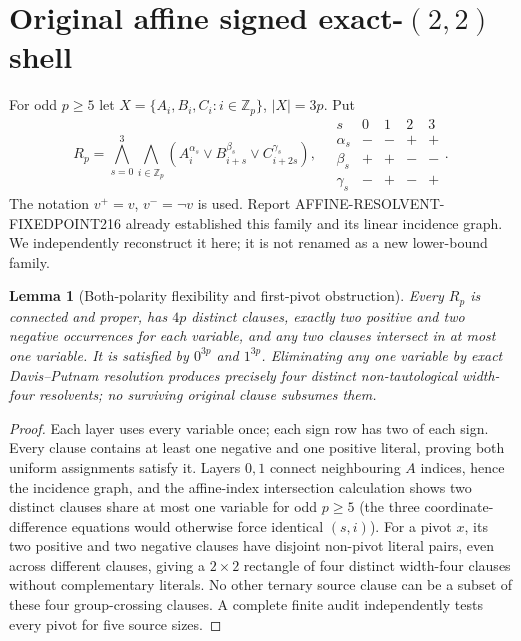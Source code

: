 \documentclass[11pt]{article}
\newtheorem{lemma}[theorem]{Lemma}
\begin{document}
\section{Original affine signed exact-$(2,2)$ shell}
For odd $p\ge5$ let $X=\{A_i,B_i,C_i:i\in\mathbb Z_p\}$, $|X|=3p$. Put
\[
R_p=\bigwedge_{s=0}^3\bigwedge_{i\in\mathbb Z_p}
 (A_i^{\alpha_s}\lor B_{i+s}^{\beta_s}\lor C_{i+2s}^{\gamma_s}),
\quad
\begin{array}{c|rrrr}s&0&1&2&3\\\hline
\alpha_s&-&-&+&+\\\beta_s&+&+&-&-\\\gamma_s&-&+&-&+
\end{array}.
\]
The notation $v^+=v$, $v^-=\neg v$ is used. Report AFFINE-RESOLVENT-FIXEDPOINT216 already established this family and its linear incidence graph. We independently reconstruct it here; it is not renamed as a new lower-bound family.

\begin{lemma}[Both-polarity flexibility and first-pivot obstruction]
Every $R_p$ is connected and proper, has $4p$ distinct clauses, exactly two positive and two negative occurrences for each variable, and any two clauses intersect in at most one variable. It is satisfied by $0^{3p}$ and $1^{3p}$. Eliminating any one variable by exact Davis--Putnam resolution produces precisely four distinct non-tautological width-four resolvents; no surviving original clause subsumes them.
\end{lemma}
\begin{proof}
Each layer uses every variable once; each sign row has two of each sign. Every clause contains at least one negative and one positive literal, proving both uniform assignments satisfy it. Layers $0,1$ connect neighbouring $A$ indices, hence the incidence graph, and the affine-index intersection calculation shows two distinct clauses share at most one variable for odd $p\ge5$ (the three coordinate-difference equations would otherwise force identical $(s,i)$). For a pivot $x$, its two positive and two negative clauses have disjoint non-pivot literal pairs, even across different clauses, giving a $2\times2$ rectangle of four distinct width-four clauses without complementary literals. No other ternary source clause can be a subset of these four group-crossing clauses. A complete finite audit independently tests every pivot for five source sizes.
\end{proof}
\end{document}
